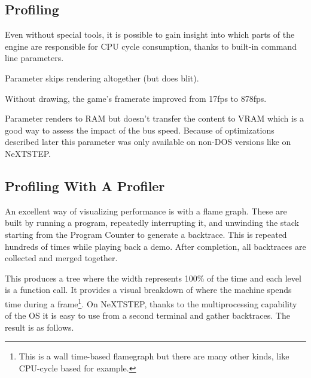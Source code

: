 \subsection{Profiling}
Even without special tools, it is possible to gain insight into which parts of the engine are responsible for CPU cycle consumption, thanks to built-in command line parameters.\\
\par
Parameter  skips rendering altogether (but does blit).\\
\par
\par
{}
\par
Without drawing, the game's framerate improved from 17fps to 878fps.\\
\par
Parameter  renders to RAM but doesn't transfer the content to VRAM which is a good way to assess the impact of the bus speed. Because of optimizations described later this parameter was only available on non-DOS versions like on NeXTSTEP.\\
\par
{}


\vspace{-10mm}
\subsection{Profiling With A Profiler}
An excellent way of visualizing performance is with a flame graph. These are built by running a program, repeatedly interrupting it, and unwinding the stack starting from the Program Counter to generate a backtrace. This is repeated hundreds of times while playing back a demo. After completion, all backtraces are collected and merged together.\\
\par
 This produces a tree where the width represents 100\% of the time and each level is a function call. It provides a visual breakdown of where the machine spends time during a frame\footnote{This is a wall time-based flamegraph but there are many other kinds, like CPU-cycle based for example.}. On NeXTSTEP, thanks to the multiprocessing capability of the OS it is easy to use  from a second terminal and gather backtraces. The result is as follows.\\
\par

